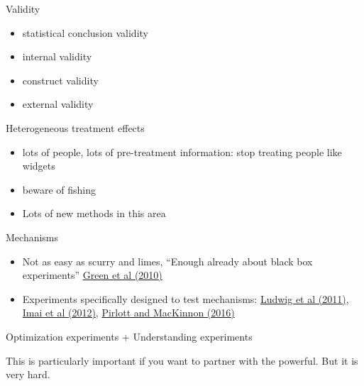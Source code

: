 \documentclass[aspectratio=169]{beamer}
\begin{document}
\begin{frame}

Validity \pause
\begin{itemize}
\item statistical conclusion validity
\item internal validity
\item construct validity
\item external validity
\end{itemize}

\end{frame}
\begin{frame}

Heterogeneous treatment effects \pause
\begin{itemize}
\item lots of people, lots of pre-treatment information: stop treating people like widgets
\pause
\item beware of fishing
\pause
\item Lots of new methods in this area
\end{itemize}

\end{frame}
\begin{frame}

Mechanisms \pause
\begin{itemize}
\item Not as easy as scurry and limes, ``Enough already about black box experiments''  \textcolor{blue}{\href{http://dx.doi.org/10.1177/0002716209351526}{Green et al (2010)}}
\pause
\item Experiments specifically designed to test mechanisms: \textcolor{blue}{\href{http://dx.doi.org/10.1257/jep.25.3.17}{Ludwig et al (2011)}}, \textcolor{blue}{\href{http://dx.doi.org/10.1111/j.1467-985X.2012.01032.x}{Imai et al (2012)}}, \textcolor{blue}{\href{http://dx.doi.org/10.1016/j.jesp.2015.09.012}{Pirlott and MacKinnon (2016)}}
\end{itemize}

\end{frame}
\begin{frame}

\Large{
\begin{center}
Optimization experiments + Understanding experiments
\end{center}
}

\pause
This is particularly important if you want to partner with the powerful.  But it is very hard.

\end{frame}
\frame{\titlepage}
\end{document}
